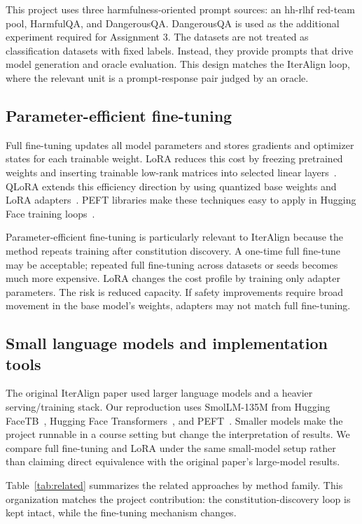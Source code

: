 \documentclass[10pt,twocolumn]{article}
\newcommand{\modelname}{SmolLM-135M}
\newcommand{\dataset}{DangerousQA}
\begin{document}
This project uses three harmfulness-oriented prompt sources: an hh-rlhf red-team pool, HarmfulQA, and \dataset. \dataset{} is used as the additional experiment required for Assignment 3. The datasets are not treated as classification datasets with fixed labels. Instead, they provide prompts that drive model generation and oracle evaluation. This design matches the IterAlign loop, where the relevant unit is a prompt-response pair judged by an oracle.

\subsection{Parameter-efficient fine-tuning}
Full fine-tuning updates all model parameters and stores gradients and optimizer states for each trainable weight. LoRA reduces this cost by freezing pretrained weights and inserting trainable low-rank matrices into selected linear layers~\cite{hu2022lora}. QLoRA extends this efficiency direction by using quantized base weights and LoRA adapters~\cite{dettmers2023qlora}. PEFT libraries make these techniques easy to apply in Hugging Face training loops~\cite{peft2022}.

Parameter-efficient fine-tuning is particularly relevant to IterAlign because the method repeats training after constitution discovery. A one-time full fine-tune may be acceptable; repeated full fine-tuning across datasets or seeds becomes much more expensive. LoRA changes the cost profile by training only adapter parameters. The risk is reduced capacity. If safety improvements require broad movement in the base model's weights, adapters may not match full fine-tuning.

\subsection{Small language models and implementation tools}
The original IterAlign paper used larger language models and a heavier serving/training stack. Our reproduction uses \modelname{} from Hugging FaceTB~\cite{allal2024smollm}, Hugging Face Transformers~\cite{wolf2020transformers}, and PEFT~\cite{peft2022}. Smaller models make the project runnable in a course setting but change the interpretation of results. We compare full fine-tuning and LoRA under the same small-model setup rather than claiming direct equivalence with the original paper's large-model results.

Table~\ref{tab:related} summarizes the related approaches by method family. This organization matches the project contribution: the constitution-discovery loop is kept intact, while the fine-tuning mechanism changes.
\end{document}
